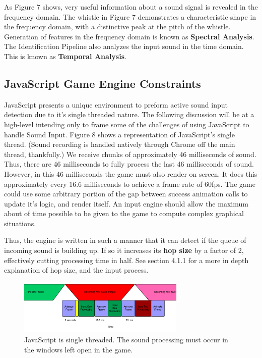 \documentclass[DIV=calc, paper=a4, fontsize=11pt, twocolumn]{scrartcl}   %
\begin{document}
  \par As Figure 7 shows, very useful information about a sound signal is revealed in the frequency domain. The whistle in Figure 7 demonstrates a characteristic shape in the frequency domain, with a distinctive peak at the pitch of the whistle. Generation of features in the frequency domain is known as \textbf{Spectral Analysis}. The Identification Pipeline also analyzes the input sound in the time domain. This is known as \textbf{Temporal Analysis}.

\subsection{JavaScript Game Engine Constraints}
JavaScript presents a unique environment to preform active sound input detection due to it's single threaded nature. The following discussion will be at a high-level intending only to frame some of the challenges of using JavaScript to handle Sound Input. Figure 8 shows a representation of JavaScript's single thread. (Sound recording is handled natively through Chrome off the main thread, thankfully.) We receive chunks of approximately 46 milliseconds of sound. Thus, there are 46 milliseconds to fully process the last 46 milliseconds of sound. However, in this 46 milliseconds the game must also render on screen. It does this approximately every 16.6 milliseconds to achieve a frame rate of 60fps. The game could use some arbitrary portion of the gap between success animation calls to update it's logic, and render itself. An input engine should allow the maximum about of time possible to be given to the game to compute complex graphical situations.
\par Thus, the engine is written in such a manner that it can detect if the queue of incoming sound is building up. If so it increases its \textbf{hop size} by a factor of 2, effectively cutting processing time in half. See section 4.1.1 for a more in depth explanation of hop size, and the input process.
\begin{figure}[h]
\centering
\includegraphics[width=80mm]{figures/JavascriptEventLoop.png}
\caption{JavaScript is single threaded. The sound processing must occur in the windows left open in the game.}
\label{overflow}
\end{figure}
\end{document}

